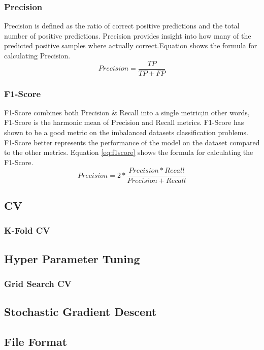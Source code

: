 \documentclass[twoside,11pt,a4paper]{article}
\begin{document}
\subsubsection{Precision}
Precision is defined as the ratio of correct positive predictions and the total number of positive predictions. Precision provides insight into how many of the predicted positive samples where actually correct.Equation \label{eq:precision} shows the formula for calculating Precision.
\begin{equation}\label{eq:precision}
	Precision = \frac{TP}{TP+FP}
\end{equation}

\subsubsection{F1-Score}
F1-Score combines both Precision \& Recall into a single metric;in other words, F1-Score is the harmonic mean of Precision and Recall metrics. F1-Score has shown to be a good metric on the imbalanced datasets classification problems. F1-Score better represents the performance of the model on the dataset compared to the other metrics. Equation \ref{eq:f1score} shows the formula for calculating the F1-Score.
\begin{equation}\label{eq:f1score}
	Precision = 2 * \frac{Precision*Recall}{Precision + Recall}
\end{equation}
\subsection{\acf{CV}}
\subsubsection{K-Fold \acs{CV}}
\subsection{Hyper Parameter Tuning}
\subsubsection{Grid Search CV}
\subsection{Stochastic Gradient Descent}
\subsection{File Format}
\end{document}
